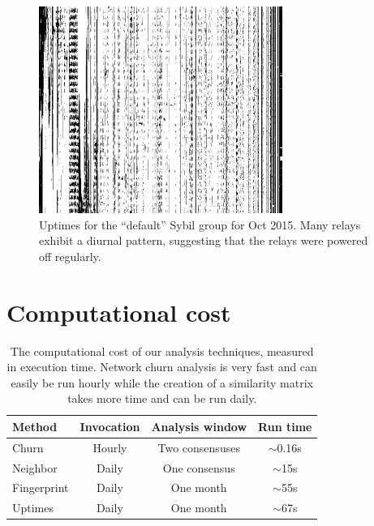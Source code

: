 \begin{figure}[t]
	\centering
	\includegraphics[width=0.8\linewidth]{diagrams/default-sybils-2015-10.jpg}
	\caption{Uptimes for the ``default'' Sybil group for Oct 2015.  Many
	relays exhibit a diurnal pattern, suggesting that the relays were powered
	off regularly.}
	\label{fig:default-sybils-uptime}
\end{figure}

\section{Computational cost}
\begin{table}[t]
	\small
	\centering
	\begin{tabular}{lccc}
	\textbf{Method} & \textbf{Invocation} & \textbf{Analysis window} & \textbf{Run time} \\
	\hline
	Churn & Hourly & Two consensuses & $\sim$0.16s \\
	Neighbor & Daily & One consensus & $\sim$15s \\
	Fingerprint & Daily & One month & $\sim$55s \\
	Uptimes & Daily & One month & $\sim$67s \\
	\end{tabular}
	\caption{The computational cost of our analysis techniques, measured in
	execution time.  Network churn analysis is very fast and can easily be run
	hourly while the creation of a similarity matrix takes more time and can be
	run daily.}
	\label{tab:exp-deployment}
\end{table}

